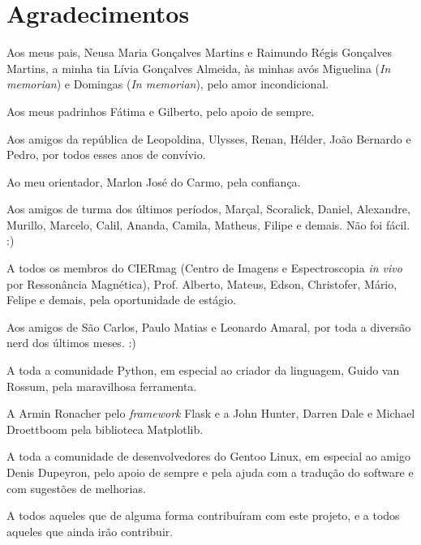 \chapter*{Agradecimentos}
    
Aos meus pais, Neusa Maria Gonçalves Martins e Raimundo Régis Gonçalves
Martins, a minha tia Lívia Gonçalves Almeida, às minhas avós Miguelina
(\textit{In memorian}) e Domingas (\textit{In memorian}), pelo amor
incondicional.

Aos meus padrinhos Fátima e Gilberto, pelo apoio de sempre.

Aos amigos da república de Leopoldina, Ulysses, Renan, Hélder, João Bernardo
e Pedro, por todos esses anos de convívio.

Ao meu orientador, Marlon José do Carmo, pela confiança.

Aos amigos de turma dos últimos períodos, Marçal, Scoralick, Daniel,
Alexandre, Murillo, Marcelo, Calil, Ananda, Camila, Matheus, Filipe e
demais. Não foi fácil. :)

A todos os membros do CIERmag (Centro de Imagens e Espectroscopia
\textit{in vivo} por Ressonância Magnética), Prof. Alberto, Mateus, Edson,
Christofer, Mário, Felipe e demais, pela oportunidade de estágio.

Aos amigos de São Carlos, Paulo Matias e Leonardo Amaral, por toda a diversão
nerd dos últimos meses. :)

A toda a comunidade Python, em especial ao criador da linguagem, Guido
van Rossum, pela maravilhosa ferramenta.

A Armin Ronacher pelo \textit{framework} Flask e a John Hunter, Darren
Dale e Michael Droettboom pela biblioteca Matplotlib.

A toda a comunidade de desenvolvedores do Gentoo Linux, em especial ao
amigo Denis Dupeyron, pelo apoio de sempre e pela ajuda com a tradução do
software e com sugestões de melhorias.

A todos aqueles que de alguma forma contribuíram com este projeto, e a
todos aqueles que ainda irão contribuir.
